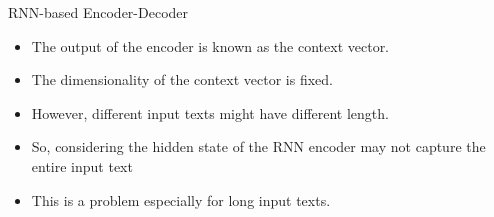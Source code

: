     
            
            

            



\begin{frame}{RNN-based Encoder-Decoder}
\begin{itemize}
    \item The output of the encoder is known as the context vector.
    \item The dimensionality of the context vector is fixed. 
    \item However, different input texts might have different length. 
    \item So, considering the hidden state of the RNN encoder may not capture the entire input text
    \item This is a problem  especially for long input texts. 
\end{itemize}
\end{frame}

